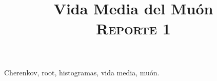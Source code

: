 \documentclass[conference]{IEEEtran}
\begin{document}
\title{Vida Media del Muón \\
{\footnotesize \scshape{Reporte 1}}
}

\author{
}



\maketitle

\begin{abstract}
    
\end{abstract}

\begin{IEEEkeywords}
	Cherenkov, root, histogramas, vida media, muón.
\end{IEEEkeywords}

%
    
\end{document}
